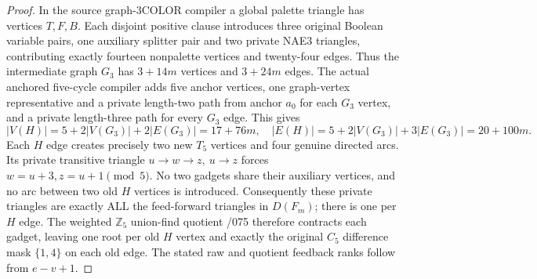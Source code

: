 \documentclass[11pt]{article}
\begin{document}
\begin{proof}
In the source graph-3COLOR compiler a global palette triangle
has vertices $T,F,B$. Each disjoint positive clause introduces
three original Boolean variable pairs, one auxiliary splitter pair
and two private NAE3 triangles, contributing exactly fourteen
nonpalette vertices and twenty-four edges.
Thus the intermediate graph $G_3$ has $3+14m$ vertices and
$3+24m$ edges. The actual anchored five-cycle compiler adds
five anchor vertices, one graph-vertex representative and a private
length-two path from anchor $a_0$ for each $G_3$ vertex, and
a private length-three path for every $G_3$ edge. This gives
\[
 |V(H)|=5+2|V(G_3)|+2|E(G_3)|=17+76m,
 \quad
 |E(H)|=5+2|V(G_3)|+3|E(G_3)|=20+100m.
\]
Each $H$ edge creates precisely two new $T_5$ vertices and four
genuine directed arcs. Its private transitive triangle
$u\to w\to z,\ u\to z$ forces $w=u+3,z=u+1\pmod5$.
No two gadgets share their auxiliary vertices, and no arc between
two old $H$ vertices is introduced. Consequently these private
triangles are exactly ALL the feed-forward triangles in $D(F_m)$;
there is one per $H$ edge. The weighted $\mathbb Z_5$ union-find
quotient /075 therefore contracts each gadget, leaving one
root per old $H$ vertex and exactly the original $C_5$
difference mask $\{1,4\}$ on each old edge. The stated raw
and quotient feedback ranks follow from $e-v+1$.


\end{proof}
\end{document}
